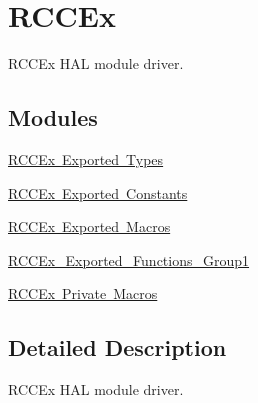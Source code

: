 \hypertarget{group___r_c_c_ex}{}\section{R\+C\+C\+Ex}
\label{group___r_c_c_ex}


R\+C\+C\+Ex H\+AL module driver.  


\subsection*{Modules}
\begin{DoxyCompactItemize}
\item 
\mbox{\hyperlink{group___r_c_c_ex___exported___types}{R\+C\+C\+Ex Exported Types}}
\item 
\mbox{\hyperlink{group___r_c_c_ex___exported___constants}{R\+C\+C\+Ex Exported Constants}}
\item 
\mbox{\hyperlink{group___r_c_c_ex___exported___macros}{R\+C\+C\+Ex Exported Macros}}
\item 
\mbox{\hyperlink{group___r_c_c_ex___exported___functions___group1}{R\+C\+C\+Ex\+\_\+\+Exported\+\_\+\+Functions\+\_\+\+Group1}}
\item 
\mbox{\hyperlink{group___r_c_c_ex___private___macros}{R\+C\+C\+Ex Private Macros}}
\end{DoxyCompactItemize}


\subsection{Detailed Description}
R\+C\+C\+Ex H\+AL module driver. 

